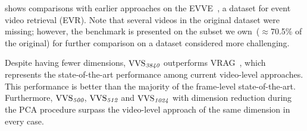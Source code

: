 \documentclass[10pt,twocolumn,letterpaper]{article}
\begin{document}
         shows comparisons with earlier approaches on the EVVE~\cite{revaud2013event}, a dataset for event video retrieval (EVR). Note that several videos in the original dataset were missing; however, the benchmark is presented on the subset we own~($\approx$70.5\% of the original) for further comparison on a dataset considered more challenging.

    
    
        Despite having fewer dimensions, $\textup{VVS}_{\textit{3840}}$ outperforms VRAG~\cite{ng2022vrag}, which represents the state-of-the-art performance among current video-level approaches. This performance is better than the majority of the frame-level state-of-the-art. Furthermore, $\textup{VVS}_{\textit{500}}$, $\textup{VVS}_{\textit{512}}$ and $\textup{VVS}_{\textit{1024}}$ with dimension reduction during the PCA procedure surpass the video-level approach of the same dimension in every case.
\end{document}
